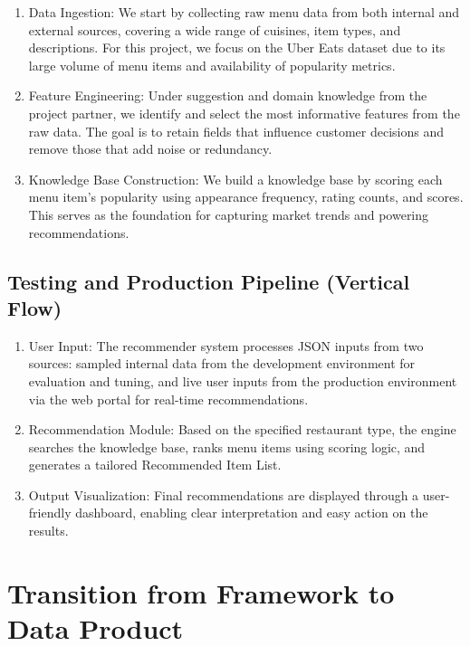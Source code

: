 \documentclass[
  11pt,
  a4paper,
  DIV=11,
  numbers=noendperiod]{scrartcl}
\providecommand{\tightlist}{%
  \setlength{\itemsep}{0pt}\setlength{\parskip}{0pt}}\usepackage{longtable,booktabs,array}
\begin{document}
\begin{enumerate}
\def\labelenumi{\arabic{enumi}.}
\tightlist
\item
  Data Ingestion: We start by collecting raw menu data from both
  internal and external sources, covering a wide range of cuisines, item
  types, and descriptions. For this project, we focus on the Uber Eats
  dataset due to its large volume of menu items and availability of
  popularity metrics.
\item
  Feature Engineering: Under suggestion and domain knowledge from the
  project partner, we identify and select the most informative features
  from the raw data. The goal is to retain fields that influence
  customer decisions and remove those that add noise or redundancy.
\item
  Knowledge Base Construction: We build a knowledge base by scoring each
  menu item's popularity using appearance frequency, rating counts, and
  scores. This serves as the foundation for capturing market trends and
  powering recommendations.
\end{enumerate}

\subsection{Testing and Production Pipeline (Vertical
Flow)}\label{testing-and-production-pipeline-vertical-flow}

\begin{enumerate}
\def\labelenumi{\arabic{enumi}.}
\tightlist
\item
  User Input: The recommender system processes JSON inputs from two
  sources: sampled internal data from the development environment for
  evaluation and tuning, and live user inputs from the production
  environment via the web portal for real-time recommendations.
\item
  Recommendation Module: Based on the specified restaurant type, the
  engine searches the knowledge base, ranks menu items using scoring
  logic, and generates a tailored Recommended Item List.
\item
  Output Visualization: Final recommendations are displayed through a
  user-friendly dashboard, enabling clear interpretation and easy action
  on the results.
\end{enumerate}

\section{Transition from Framework to Data
Product}\label{transition-from-framework-to-data-product}
\end{document}
